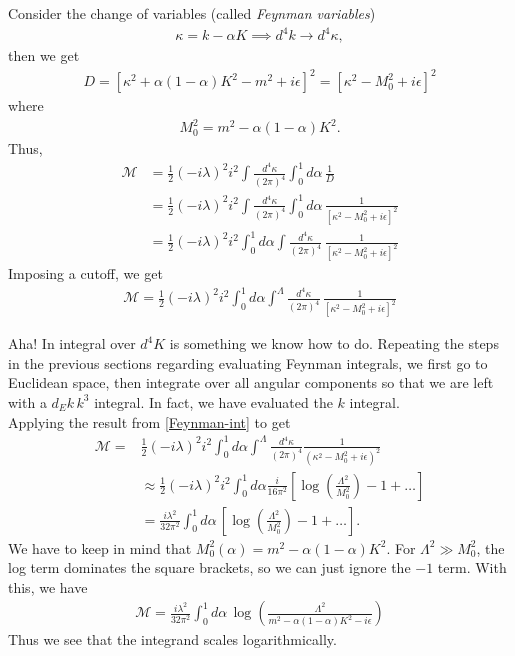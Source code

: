 \documentclass{book}
\theoremstyle{definition}
\newcommand{\f}[2]{\frac{#1}{#2}}
\newcommand{\lp}{\left(}
\newcommand{\rp}{\right)}
\newcommand{\lb}{\left[}
\newcommand{\rb}{\right]}
\begin{document}
Consider the change of variables (called \textit{Feynman variables})
\begin{align}
\kappa =  k - \alpha K \implies d^4k \to d^4\kappa,
\end{align}
then we get
\begin{align}
D = [\kappa^2 + \alpha(1-\alpha)K^2 - m^2 + i\epsilon]^2 = [\kappa^2 - M_0^2 + i\epsilon ]^2
\end{align}
where
\begin{align}
M_0^2 = m^2  - \alpha(1 - \alpha)K^2.
\end{align}
Thus,
\begin{align}
\mathcal{M} &= \f{1}{2}(-i\lambda)^2 i^2 \int \f{d^4\kappa}{(2\pi)^4} \int^1_0 d\alpha\,\f{1}{D} \nonumber\\
&= \f{1}{2}(-i\lambda)^2 i^2 \int \f{d^4\kappa}{(2\pi)^4}  \int^1_0 d\alpha \, \f{1}{[\kappa^2 - M_0^2 + i\epsilon ]^2}\nonumber\\
&= {\f{1}{2}(-i\lambda)^2 i^2  \int^1_0 d\alpha \int \f{d^4\kappa}{(2\pi)^4}  \, \f{1}{[\kappa^2 - M_0^2 + i\epsilon ]^2}}
\end{align}
Imposing a cutoff, we get
\begin{align}
\boxed{\mathcal{M} = \f{1}{2}(-i\lambda)^2 i^2  \int^1_0 d\alpha \int^\Lambda \f{d^4\kappa}{(2\pi)^4}  \, \f{1}{[\kappa^2 - M_0^2 + i\epsilon ]^2}}
\end{align}

Aha! In integral over $d^4 K$ is something we know how to do. Repeating the steps in the previous sections regarding evaluating Feynman integrals, we first go to Euclidean space, then integrate over all angular components so that we are left with a $d_E k\, k^{3}$ integral. In fact, we have evaluated the $k$ integral. \\


Applying the result from \eqref{Feynman-int} to get
\begin{align}\label{exact}
\mathcal{M} =& \f{1}{2}(-i\lambda)^2 i^2  \int^1_0 d\alpha\int^{\Lambda} \f{d^4\kappa}{(2\pi)^4} \f{1}{(\kappa^2 - M_0^2+ i\epsilon)^2} \nonumber \\
&\approx \f{1}{2}(-i\lambda)^2 i^2  \int^1_0 d\alpha \f{i}{16\pi^2} \lb \log\lp \f{\Lambda^2}{M_0^2} \rp  - 1 + \dots \rb \nonumber\\
&= \f{i\lambda^2}{32\pi^2} \int^1_0 d\alpha\, \lb \log\lp \f{\Lambda^2}{M_0^2} \rp  - 1 + \dots \rb.
\end{align}
We have to keep in mind that $M_0^2(\alpha) = m^2  - \alpha(1 - \alpha)K^2$. For $\Lambda^2 \gg M_0^2$, the log term dominates the square brackets, so we can just ignore the $-1$ term. With this, we have
\begin{align}\label{amplitudeM}
\boxed{\mathcal{M}  = \f{i\lambda^2}{32\pi^2} \int^1_0 d\alpha\,  \log\lp \f{\Lambda^2}{m^2  - \alpha(1 - \alpha)K^2 - i\epsilon} \rp }
\end{align}
Thus we see that the integrand scales logarithmically. \\
\end{document}
